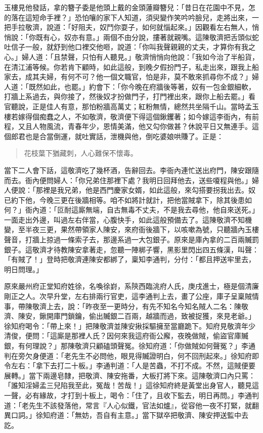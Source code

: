 玉樓見他發話，拿的簪子委是他頭上戴的金頭蓮瓣簪兒：「昔日在花園中不見，怎的落在這短命手裡？」恐怕嚷的家下人知道，須臾變作笑吟吟臉兒，走將出來，一把手拉敬濟，說道：「好阻夫，奴鬥你耍子，如何就惱起來。」因觀看左右無人，悄悄說：「你既有心，奴亦有意。」兩個不由分說，摟著就親嘴。這陳敬濟把舌頭似蛇吐信子一般，就舒到他口裡交他咂，說道：「你叫我聲親親的丈夫，才算你有我之心。」婦人道：「且禁聲，只怕有人聽見。」敬濟悄悄向他說：「我如今治了半船貨，在清江浦等候。你若肯下顧時，如此這般，到晚夕假扮門子，私走出來，跟我上船家去，成其夫婦，有何不可？他一個文職官，怕是非，莫不敢來抓尋你不成？」婦人道：「既然如此，也罷。」約會下：「你今晚在府牆後等著，奴有一包金銀細軟，打牆上系過去，與你接了，然後奴才扮做門子，打門裡出來，跟你上船去罷。」看官聽說，正是佳人有意，那怕粉牆高萬丈；紅粉無情，總然共坐隔千山。當時孟玉樓若嫁得個痴蠢之人，不如敬濟，敬濟便下得這個鍬钁著；如今嫁這李衙內，有前程，又且人物風流，青春年少，恩情美滿，他又勾你做甚？休說平日又無連手。這個郎君也是合當倒運，就吐實話，泄機與他，倒吃婆娘哄賺了。正是：
\begin{quote}
花枝葉下猶藏刺，人心難保不懷毒。
\end{quote}

當下二人會下話，這敬濟吃了幾杯酒，告辭回去。李衙內連忙送出府門，陳安跟隨而去。衙內便問婦人：「你兄弟住那裡下處？我明日回拜他去，送些嗄程與他。」婦人便說：「那裡是我兄弟，他是西門慶家女婿，如此這般，來勾搭要拐我出去。奴已約下他，今晚三更在後牆相等。咱不如將計就計，把他當賊拿下，除其後患如何？」衙內道：「叵耐這廝無端，自古無毒不丈夫，不是我去尋他，他自來送死。」一面走出外邊，叫過左右伴當，心腹快手，如此這般預備去了。這陳敬濟不知機變，至半夜三更，果然帶領家人陳安，來府衙後牆下，以咳嗽為號，只聽牆內玉樓聲音，打牆上掠過一條索子去，那邊系過一大包銀子。原來是庫內拿的二百兩贓罰銀子。這敬濟才待教陳安拿著走，忽聽一陣梆子響，黑影里閃出四五條漢，叫聲：「有賊了！」登時把敬濟連陳安都綁了，稟知李通判，分付：「都且押送牢里去，明日問理。」

原來嚴州府正堂知府姓徐，名喚徐崶，系陝西臨洮府人氏，庚戌進士，極是個清廉剛正之人。次早升堂，左右排兩行官吏，這李通判上去，畫了公座，庫子呈稟賊情事，帶陳敬濟上去，說：「昨夜至一更時分，有先不知名今知名賊人二名：陳敬濟、陳安，鍬開庫門鎖鑰，偷出贓銀二百兩，越牆而過，致被捉獲，來見老爺。」徐知府喝令：「帶上來！」把陳敬濟並陳安揪採驅擁至當廳跪下。知府見敬濟年少清俊，便問：「這廝是那裡人氏？因何來我這府衙公廨，夜晚做賊，偷盜官庫贓銀，有何理說？」那陳敬濟只顧磕頭聲冤。徐知府道：「你做賊如何聲冤？」李通判在旁欠身便道：「老先生不必問他，眼見得贓證明白，何不回刑起來。」徐知府即令左右：「拿下去打二十板。」李通判道：「人是苦蟲，不打不成。不然，這賊便要展轉。」當下兩邊皂隸，把敬濟、陳安拖番，大板打將下來。這陳敬濟口內只罵：「誰知淫婦孟三兒陷我至此，冤哉！苦哉！」這徐知府終是黃堂出身官人，聽見這一聲，必有緣故，才打到十板上，喝令：「住了，且收下監去，明日再問。」李通判道：「老先生不該發落他，常言『人心似鐵，官法如爐』，從容他一夜不打緊，就翻異口詞。」徐知府道：「無妨，吾自有主意。」當下獄卒把敬濟、陳安押送監中去訖。

